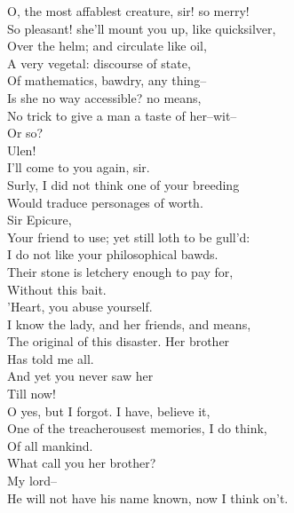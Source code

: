 \documentclass{memoir}
\begin{document}
\begin{drama*}
\facespeaks {} O, the most affablest creature, sir! so merry!\\
 So pleasant! she'll mount you up, like quicksilver,\\
 Over the helm; and circulate like oil,\\
 A very vegetal: discourse of state,\\
 Of mathematics, bawdry, any thing--\\
\mammonspeaks {} Is she no way accessible? no means,\\
 No trick to give a man a taste of her--wit--\\
 Or so?\\
\subtlespeaks {} Ulen!\\
\facespeaks {} I'll come to you again, sir.\\
\mammonspeaks {} Surly, I did not think one of your breeding\\
 Would traduce personages of worth.\\
\surlyspeaks  Sir Epicure,\\
 Your friend to use; yet still loth to be gull'd:\\
 I do not like your philosophical bawds.\\
 Their stone is letchery enough to pay for,\\
 Without this bait.\\
\mammonspeaks {} 'Heart, you abuse yourself.\\
 I know the lady, and her friends, and means,\\
 The original of this disaster. Her brother\\
 Has told me all.\\
\surlyspeaks {} And yet you never saw her\\
 Till now!\\
\mammonspeaks {} O yes, but I forgot. I have, believe it,\\
 One of the treacherousest memories, I do think,\\
 Of all mankind.\\
\surlyspeaks {} What call you her brother?\\
\mammonspeaks  My lord--\\
 He will not have his name known, now I think on't.\\

\end{drama*}
\end{document}
